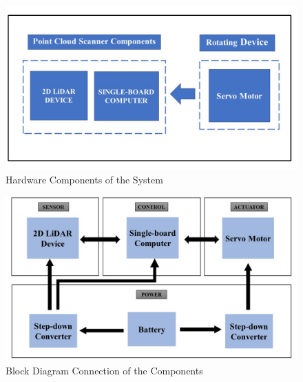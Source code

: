 \begin{figure}[H]
	\centering
	\includegraphics[width=1\textwidth]{Figures/3D-PCSS components}
	\caption{Hardware Components of the System}
	\label{ch3:fig:components_of_3d-pcss}
\end{figure}

\begin{figure}[H]
	\centering
	\includegraphics[width=1\textwidth]{Figures/components-block-diagram}
	\caption{Block Diagram Connection of the Components}
	\label{ch3:fig:block-digram-connection}
\end{figure}



